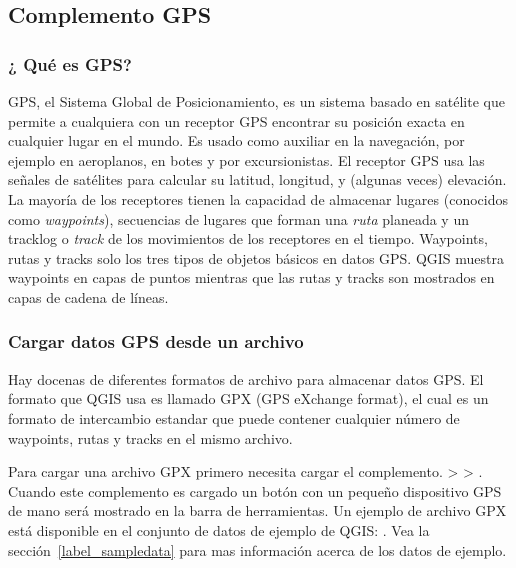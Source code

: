 
\subsection{Complemento GPS}\label{label_plugingps}


\subsubsection{¿ Qué es GPS?}\label{whatsgps}

GPS, el Sistema Global de Posicionamiento, es un sistema basado en satélite que permite a cualquiera con un receptor GPS encontrar su posición exacta en cualquier lugar en el mundo.
Es usado como auxiliar en la navegación, por ejemplo en aeroplanos, en botes y por excursionistas.
El receptor GPS usa las señales de satélites para calcular su latitud, longitud, y (algunas veces) elevación.
La mayoría de los receptores tienen la capacidad de almacenar lugares (conocidos como \emph{waypoints}), secuencias de lugares que forman una \emph{ruta} planeada y un tracklog o \emph{track} de los movimientos de los receptores en el tiempo.
Waypoints, rutas y tracks solo los tres tipos de objetos básicos en datos GPS.
QGIS muestra waypoints en capas de puntos mientras que las rutas y tracks son mostrados en capas de cadena de líneas.

\subsubsection{Cargar datos GPS desde un archivo}\label{label_loadgps}

Hay docenas de diferentes formatos de archivo para almacenar datos GPS.
El formato que QGIS usa es llamado GPX (GPS eXchange format), el cual es un formato de intercambio estandar que puede contener cualquier número de waypoints, rutas y tracks en el mismo archivo.

Para cargar una archivo GPX  primero necesita cargar el complemento.
 >  > . Cuando este complemento es cargado un botón con un pequeño dispositivo GPS de mano será mostrado en la barra de herramientas. Un ejemplo de archivo GPX está disponible en el conjunto de datos de ejemplo de QGIS:
. Vea 
la sección~\ref{label_sampledata} para mas información acerca de los datos de ejemplo.

